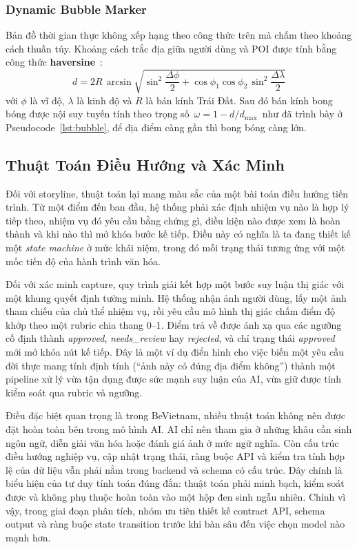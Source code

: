 \subsubsection{Dynamic Bubble Marker}
\contrib

Bản đồ thời gian thực không xếp hạng theo công thức trên mà chấm theo
khoảng cách thuần túy. Khoảng cách trắc địa giữa người dùng và POI được
tính bằng công thức \textbf{haversine}~\cite{sinnott1984}:
\begin{equation}
d = 2R\,\arcsin\!\sqrt{\sin^2\!\frac{\Delta\phi}{2} + \cos\phi_1\cos\phi_2\,\sin^2\!\frac{\Delta\lambda}{2}}
\label{eq:haversine}
\end{equation}
với $\phi$ là vĩ độ, $\lambda$ là kinh độ và $R$ là bán kính Trái Đất.
Sau đó bán kính bong bóng được nội suy tuyến tính theo trọng số
$\,\omega = 1 - d/d_{\max}\,$ như đã trình bày ở
Pseudocode~\ref{lst:bubble}, để địa điểm càng gần thì bong bóng càng lớn.

\subsection{Thuật Toán Điều Hướng và Xác Minh}
\contrib

Đối với storyline, thuật toán lại mang màu sắc của một bài toán điều
hướng tiến trình. Từ một điểm đến ban đầu, hệ thống phải xác định nhiệm
vụ nào là hợp lý tiếp theo, nhiệm vụ đó yêu cầu bằng chứng gì, điều kiện
nào được xem là hoàn thành và khi nào thì mở khóa bước kế tiếp. Điều này
có nghĩa là ta đang thiết kế một \textit{state machine} ở mức khái niệm,
trong đó mỗi trạng thái tương ứng với một mốc tiến độ của hành trình văn
hóa.

Đối với xác minh capture, quy trình giải kết hợp một bước suy luận thị
giác với một khung quyết định tường minh. Hệ thống nhận ảnh người dùng,
lấy một ảnh tham chiếu của chủ thể nhiệm vụ, rồi yêu cầu mô hình thị giác
chấm điểm độ khớp theo một rubric chia thang 0--1. Điểm trả về được ánh
xạ qua các ngưỡng cố định thành \textit{approved}, \textit{needs\_review}
hay \textit{rejected}, và chỉ trạng thái \textit{approved} mới mở khóa nút
kế tiếp. Đây là một ví dụ điển hình cho việc biến một yêu cầu đời thực
mang tính định tính (``ảnh này có đúng địa điểm không'') thành một
pipeline xử lý vừa tận dụng được sức mạnh suy luận của AI, vừa giữ được
tính kiểm soát qua rubric và ngưỡng.

Điều đặc biệt quan trọng là trong BeVietnam, nhiều thuật toán không nên
được đặt hoàn toàn bên trong mô hình AI. AI chỉ nên tham gia ở những
khâu cần sinh ngôn ngữ, diễn giải văn hóa hoặc đánh giá ảnh ở mức ngữ
nghĩa. Còn cấu trúc điều hướng nghiệp vụ, cập nhật trạng thái, ràng buộc
API và kiểm tra tính hợp lệ của dữ liệu vẫn phải nằm trong backend và
schema có cấu trúc. Đây chính là biểu hiện của tư duy tính toán đúng
đắn: thuật toán phải minh bạch, kiểm soát được và không phụ thuộc hoàn
toàn vào một hộp đen sinh ngẫu nhiên. Chính vì vậy, trong giai đoạn
phân tích, nhóm ưu tiên thiết kế contract API, schema output và ràng
buộc state transition trước khi bàn sâu đến việc chọn model nào mạnh
hơn.

